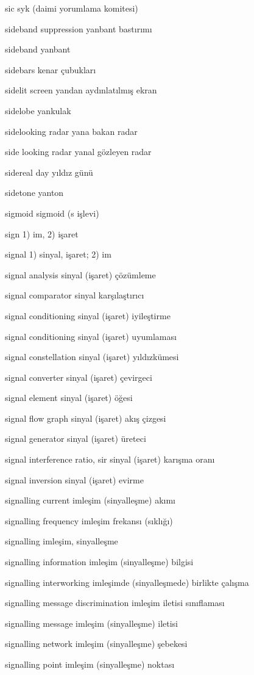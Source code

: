 \documentclass[12pt,fleqn]{article}\usepackage{../../common}
\begin{document}
sic syk (daimi yorumlama komitesi)

sideband suppression yanbant bastırımı

sideband yanbant

sidebars kenar çubukları

sidelit screen yandan aydınlatılmış ekran

sidelobe yankulak

sidelooking radar yana bakan radar

side looking radar yanal gözleyen radar

sidereal day yıldız günü

sidetone yanton

sigmoid sigmoid (s işlevi)

sign 1) im, 2) işaret

signal 1) sinyal, işaret; 2) im

signal analysis sinyal (işaret) çözümleme

signal comparator sinyal karşılaştırıcı

signal conditioning sinyal (işaret) iyileştirme

signal conditioning sinyal (işaret) uyumlaması

signal constellation sinyal (işaret) yıldızkümesi

signal converter sinyal (işaret) çevirgeci

signal element sinyal (işaret) öğesi

signal flow graph sinyal (işaret) akış çizgesi

signal generator sinyal (işaret) üreteci

signal interference ratio, sir sinyal (işaret) karışma oranı

signal inversion sinyal (işaret) evirme

signalling current imleşim (sinyalleşme) akımı

signalling frequency imleşim frekansı (sıklığı)

signalling imleşim, sinyalleşme

signalling information imleşim (sinyalleşme) bilgisi

signalling interworking imleşimde (sinyalleşmede) birlikte çalışma

signalling message discrimination imleşim iletisi sınıflaması

signalling message imleşim (sinyalleşme) iletisi

signalling network imleşim (sinyalleşme) şebekesi

signalling point imleşim (sinyalleşme) noktası
\end{document}

